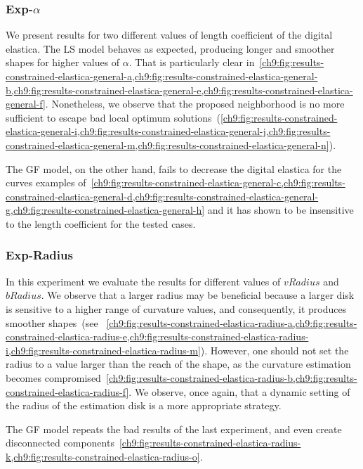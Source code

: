 {\subsubsection{Exp-$\alpha$}
We present results for two different values of length coefficient of the digital elastica. The LS model behaves as expected, producing longer and smoother shapes for higher values of $\alpha$. That is particularly clear in~\cref{ch9:fig:results-constrained-elastica-general-a,ch9:fig:results-constrained-elastica-general-b,ch9:fig:results-constrained-elastica-general-e,ch9:fig:results-constrained-elastica-general-f}. Nonetheless, we observe that the proposed neighborhood is no more sufficient to escape bad local optimum solutions~(\cref{ch9:fig:results-constrained-elastica-general-i,ch9:fig:results-constrained-elastica-general-j,ch9:fig:results-constrained-elastica-general-m,ch9:fig:results-constrained-elastica-general-n}).

The GF model, on the other hand, fails to decrease the digital elastica for the curves examples of~\cref{ch9:fig:results-constrained-elastica-general-c,ch9:fig:results-constrained-elastica-general-d,ch9:fig:results-constrained-elastica-general-g,ch9:fig:results-constrained-elastica-general-h} and it has shown to be insensitive to the length coefficient for the tested cases.

\subsubsection{Exp-Radius}

In this experiment we evaluate the results for different values of $vRadius$ and $bRadius$. We observe that a larger radius may be beneficial because a larger disk is sensitive to a higher range of curvature values, and consequently, it produces smoother shapes~(see~ \cref{ch9:fig:results-constrained-elastica-radius-a,ch9:fig:results-constrained-elastica-radius-e,ch9:fig:results-constrained-elastica-radius-i,ch9:fig:results-constrained-elastica-radius-m}). However, one should not set the radius to a value larger than the reach of the shape, as the curvature estimation becomes compromised~\cref{ch9:fig:results-constrained-elastica-radius-b,ch9:fig:results-constrained-elastica-radius-f}. We observe, once again, that a dynamic setting of the radius of the estimation disk is a more appropriate strategy.

The GF model repeats the bad results of the last experiment, and even create disconnected components~\cref{ch9:fig:results-constrained-elastica-radius-k,ch9:fig:results-constrained-elastica-radius-o}.
}
